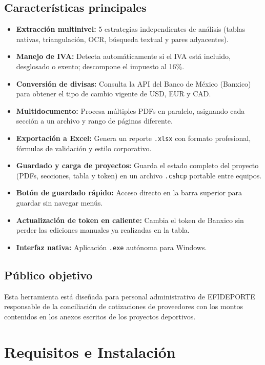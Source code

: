 \documentclass[12pt, a4paper, oneside]{report}
\begin{document}
\section{Características principales}

\begin{itemize}
  \item \textbf{Extracción multinivel:} 5 estrategias independientes de análisis
        (tablas nativas, triangulación, OCR, búsqueda textual y pares adyacentes).
  \item \textbf{Manejo de IVA:} Detecta automáticamente si el IVA está incluido,
        desglosado o exento; descompone el impuesto al 16\%.
  \item \textbf{Conversión de divisas:} Consulta la API del Banco de México (Banxico)
        para obtener el tipo de cambio vigente de USD, EUR y CAD.
  \item \textbf{Multidocumento:} Procesa múltiples PDFs en paralelo, asignando cada
        sección a un archivo y rango de páginas diferente.
  \item \textbf{Exportación a Excel:} Genera un reporte \texttt{.xlsx} con formato
        profesional, fórmulas de validación y estilo corporativo.
  \item \textbf{Guardado y carga de proyectos:} Guarda el estado completo del
        proyecto (PDFs, secciones, tabla y token) en un archivo \texttt{.cshcp}
        portable entre equipos.
  \item \textbf{Botón de guardado rápido:} Acceso directo en la barra superior
        para guardar sin navegar menús.
  \item \textbf{Actualización de token en caliente:} Cambia el token de Banxico
        sin perder las ediciones manuales ya realizadas en la tabla.
  \item \textbf{Interfaz nativa:} Aplicación \texttt{.exe} autónoma para Windows.
\end{itemize}

\section{Público objetivo}

Esta herramienta está diseñada para personal administrativo de EFIDEPORTE
responsable de la conciliación de cotizaciones de proveedores con los montos
contenidos en los anexos escritos de los proyectos deportivos.

\chapter{Requisitos e Instalación}
\end{document}
